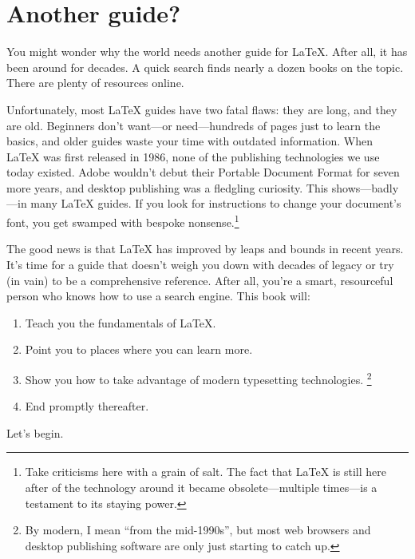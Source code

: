 \section{Another guide?}

You might wonder why the world needs another guide for \LaTeX{}.
After all, it has been around for decades.
A quick search finds nearly a dozen books on the topic.
There are plenty of resources online.

Unfortunately, most \LaTeX{} guides have two fatal flaws:
they are long, and they are old.
Beginners don't want---or need---hundreds of pages just to learn the basics,
and older guides waste your time with outdated information.
When \LaTeX{} was first released in 1986, none of the publishing technologies
we use today existed.
Adobe wouldn't debut their Portable Document Format for seven more years,
and desktop publishing was a fledgling curiosity.
This shows---badly---in many \LaTeX{} guides.
If you look for instructions to change your document's font,
you get swamped with bespoke nonsense.\punckern\footnote{%
Take criticisms here with a grain of
salt. The fact that \LaTeX{} is still here after of the technology around it became
obsolete---multiple times---is a testament to its staying power.}
\clearpage

The good news is that  \LaTeX{} has improved by leaps and bounds in recent years.
It's time for a guide that doesn't weigh you down with decades of legacy
or try (in vain) to be a comprehensive reference.
After all, you're a smart, resourceful person who knows how to use a
search engine.
This book will:

\begin{enumerate}
\item Teach you the fundamentals of \LaTeX.
\item Point you to places where you can learn more.
\item Show you how to take advantage of modern typesetting technologies.%
    \footnote{By modern, I mean ``from the mid-1990s''\quotekern,
    but most web browsers and desktop publishing software are only just starting
    to catch up.}
\item End promptly thereafter.
\end{enumerate}
\vspace{\baselineskip}

\noindent Let's begin.
